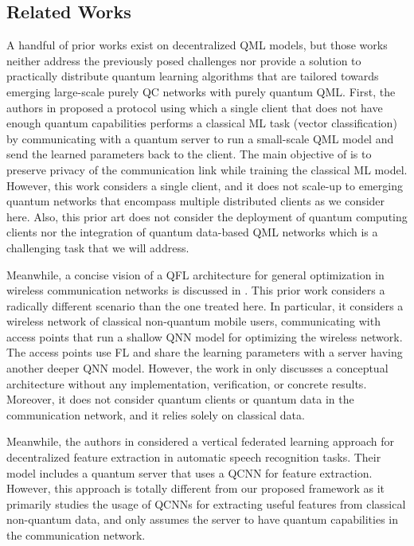 \documentclass{article}
\begin{document}
\subsection{Related Works}
\label{related_works}
A handful of prior works \cite{distributed_secure_QML,narottama2020quantum,yang2020decentralizing_VFL_speech,chen2021federated} exist on decentralized QML models, but those works neither address the previously posed challenges nor provide a solution to practically distribute quantum learning algorithms that are tailored towards emerging large-scale purely QC networks with purely quantum QML. First, the authors in \cite{distributed_secure_QML} proposed a protocol using which a single client that does not have enough quantum capabilities performs a classical ML task (vector classification) by communicating with a quantum server to run a small-scale QML model and send the learned parameters back to the client. The main objective of \cite{distributed_secure_QML} is to preserve privacy of the communication link while training the classical ML model. However, this work considers a single client, and it does not scale-up to emerging quantum networks that encompass multiple distributed clients as we consider here. Also, this prior art \cite{distributed_secure_QML} does not consider the deployment of quantum computing clients nor the  integration of quantum data-based QML networks which is a challenging task that we will address.

Meanwhile, a concise vision of a QFL architecture for general optimization in wireless communication networks is discussed in \cite{narottama2020quantum}. This prior work considers a radically different scenario than the one treated here. In particular, it considers a wireless network of classical non-quantum mobile users, communicating with access points that run a shallow QNN model for optimizing the wireless network. The access points use FL and share the learning parameters with a server having another deeper QNN model. However, the work in \cite{narottama2020quantum} only discusses a conceptual architecture without any implementation, verification, or concrete results. Moreover, it does not consider quantum clients or quantum data in the communication network, and it relies solely on classical data. 

Meanwhile, the authors in \cite{yang2020decentralizing_VFL_speech} considered a vertical federated learning approach for decentralized feature extraction in automatic speech recognition tasks. Their model includes a quantum server that uses a QCNN for feature extraction. However, this approach is totally different from our proposed framework as it primarily studies the usage of QCNNs for extracting useful features from classical non-quantum data, and only assumes the server to have quantum capabilities in the communication network.
\end{document}
